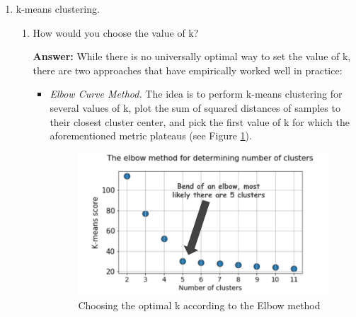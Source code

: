 \documentclass{article}
\newenvironment{QandA}{\begin{enumerate}[label=\arabic*.]}{\end{enumerate}}
\newenvironment{InnerQandA}{\begin{enumerate}[label=\roman*.]}{\end{enumerate}}
\newenvironment{answer}{\par\normalfont \textbf{Answer:}}{}
\begin{document}
\begin{QandA}
\begin{InnerQandA}
\begin{answer}
            (Source: \href{https://en.wikipedia.org/wiki/Feature_selection}{Wikipedia})
        \end{answer}
    \end{InnerQandA}

    \item k-means clustering.
    \begin{InnerQandA}
        \item How would you choose the value of k?
        \begin{answer}
            While there is no universally optimal way to set the value of k, there are two approaches that have empirically worked well in practice:
            \begin{itemize}
                \item \textit{Elbow Curve Method.} The idea is to perform k-means clustering for several values of k, plot the sum of squared distances of samples to their closest cluster center, and pick the first value of k for which the aforementioned metric plateaus (see Figure \ref{fig:elbow}).
                \begin{figure}[htb!]
                    \centering
                    \includegraphics[width=0.9\columnwidth]{img/elbow.png}
                    \caption{Choosing the optimal k according to the Elbow method \footnotemark }
                    \label{fig:elbow}
                \end{figure}


\end{itemize}
\end{answer}
\end{InnerQandA}
\end{QandA}
\end{document}
